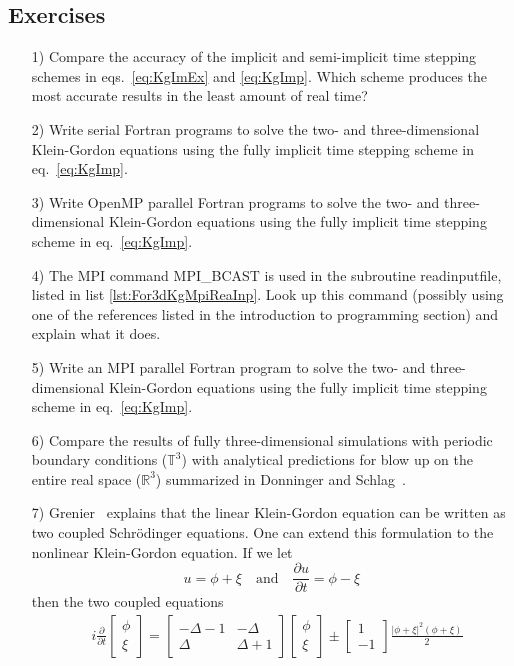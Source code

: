 \subsection{Exercises}
\begin{enumerate}
\item[1)] Compare the accuracy of the implicit and semi-implicit time stepping schemes in eqs.\ \eqref{eq:KgImEx} and \eqref{eq:KgImp}. Which scheme produces the most accurate results in the least amount of real time?  
\item[2)] Write serial Fortran programs to solve the two- and three-dimensional Klein-Gordon equations using the fully implicit time stepping scheme in eq.\ \eqref{eq:KgImp}.
\item[3)] Write OpenMP parallel Fortran programs to solve the two- and three-dimensional Klein-Gordon equations using the fully implicit time stepping scheme in eq.\ \eqref{eq:KgImp}.
\item[4)] The MPI command MPI\_BCAST is used in the subroutine readinputfile, listed in list \ref{lst:For3dKgMpiReaInp}. Look up this command (possibly using one of the references listed in the introduction to programming section) and explain what it does. 
\item[5)] Write an MPI parallel Fortran program to solve the two- and three-dimensional Klein-Gordon equations using the fully implicit time stepping scheme in eq.\ \eqref{eq:KgImp}.
\item[6)] Compare the results of fully three-dimensional simulations with periodic boundary conditions ($\mathbb{T}^3$) with analytical predictions for blow up on the entire real space ($\mathbb{R}^3$) summarized in Donninger and Schlag~\cite{DonSch11}.
\item[7)] Grenier~\cite[p.~18]{Gre94} explains that the linear Klein-Gordon equation can be written as two coupled Schr\"{o}dinger equations. One can extend this formulation to the nonlinear Klein-Gordon equation. If we let
\begin{equation}\label{eq:KgSchDecomp1}
u=\phi+\xi \quad\text{and}\quad\frac{\partial u}{\partial t}=\phi-\xi
\end{equation}
then the two coupled equations
\begin{align}\label{eq:KgSchDecomp2}
&{} i\frac{\partial }{\partial t}\begin{bmatrix}\phi \\ \xi \end{bmatrix}= \begin{bmatrix} -\Delta  -1 & -\Delta \\ \Delta & \Delta + 1 \end{bmatrix}\begin{bmatrix}\phi \\ \xi \end{bmatrix} \pm\begin{bmatrix}1 \\ -1 \end{bmatrix} \frac{\lvert \phi+\xi\rvert^2(\phi+\xi)}{2}

\end{align}
\end{enumerate}
